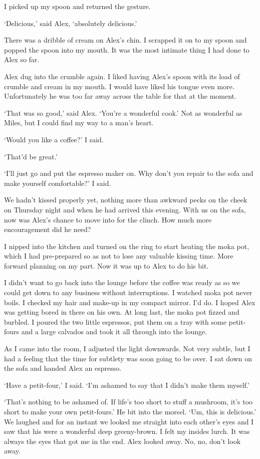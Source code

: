 I picked up my spoon and returned the gesture.

`Delicious,' said Alex, `absolutely delicious.'

There was a dribble of cream on Alex's chin. I scrapped it on to my
spoon and popped the spoon into my mouth. It was the most intimate
thing I had done to Alex so far.

Alex dug into the crumble again. I liked having Alex's spoon with
its load of crumble and cream in my mouth. I would have liked his
tongue even more. Unfortunately he was too far away across the table
for that at the moment.

`That was so good,' said Alex. `You're a wonderful cook.' Not as
wonderful as Miles, but I could find my way to a man's heart.

`Would you like a coffee?' I said.

`That'd be great.'

`I'll just go and put the espresso maker on. Why don't you repair to
the sofa and make yourself comfortable?' I said.

We hadn't kissed properly yet, nothing more than awkward pecks on
the cheek on Thursday night and when he had arrived this evening.
With us on the sofa, now was Alex's chance to move into for the
clinch. How much more encouragement did he need?

I nipped into the kitchen and turned on the ring to start heating
the moka pot, which I had pre-prepared so as not to lose any
valuable kissing time. More forward planning on my part. Now it was
up to Alex to do his bit.

I didn't want to go back into the lounge before the coffee was ready
as so we could get down to any business without interruptions. I
watched moka pot never boils. I checked my hair and make-up in my
compact mirror. I'd do. I hoped Alex was getting bored in there on
his own. At long last, the moka pot fizzed and burbled. I poured the
two little espressos, put them on a tray with some petit-fours and a
large calvados and took it all through into the lounge.

As I came into the room, I adjusted the light downwards. Not very
subtle, but I had a feeling that the time for subtlety was soon
going to be over. I sat down on the sofa and handed Alex an
espresso.

`Have a petit-four,' I said. `I'm ashamed to say that I didn't make
them myself.'

`That's nothing to be ashamed of. If life's too short to stuff a
mushroom, it's too short to make your own petit-fours.' He bit into
the morsel. `Um, this is delicious.' We laughed and for an instant
we looked me straight into each other's eyes and I saw that his
were a wonderful deep greeny-brown. I felt my insides lurch. It was
always the eyes that got me in the end. Alex looked away. No, no,
don't look away.

